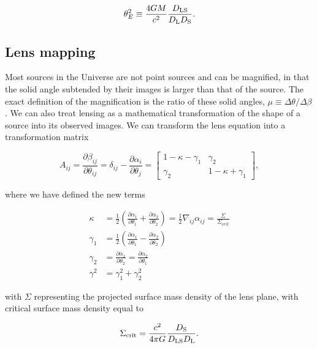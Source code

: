 \begin{equation}
\theta_E^2 \equiv \frac{4GM}{c^2} \frac{D_\mathrm{LS}}{D_\mathrm{L}D_\mathrm{S}}.
\label{intro:eqn:einstein_radius}
\end{equation}

\subsection{Lens mapping}

Most sources in the Universe are not point sources and can be magnified, in that the solid angle subtended by their images is larger than that of the source. The exact definition of the magnification is the ratio of these solid angles,
$\mu \equiv \Delta \theta/\Delta \beta$. We can also treat lensing as a mathematical transformation of the shape of a source into its observed images. We can transform the lens equation into a transformation matrix

\begin{equation}
A_{ij} = \frac{\partial \beta_{ij}}{\partial \theta_{ij}} = \delta_{ij} - \frac{\partial{\alpha_{i}}}{\partial{\theta_{j}}} = 
	\begin{bmatrix}
		1-\kappa-\gamma_1 & \gamma_2 \\
		\gamma_2 & 1-\kappa+\gamma_1
	\end{bmatrix},
\end{equation}

\noindent where we have defined the new terms

\begin{align}
\kappa &= \frac{1}{2} \left(\frac{\partial{\alpha_{1}}}{\partial{\theta_{1}}}+\frac{\partial{\alpha_{2}}}{\partial{\theta_{2}}}\right) = \frac{1}{2} \nabla_{ij} \alpha_{ij} = \frac{\Sigma}{\Sigma_{crit}} \label{intro:eqn:kappa} \\
\gamma_1 &= \frac{1}{2} \left(\frac{\partial{\alpha_{1}}}{\partial{\theta_{1}}}-\frac{\partial{\alpha_{2}}}{\partial{\theta_{2}}}\right) \\
\gamma_2 &= \frac{\partial{\alpha_{1}}}{\partial{\theta_{2}}} = \frac{\partial{\alpha_{2}}}{\partial{\theta_{1}}} \\
\gamma^2 &= \gamma_1^2 + \gamma_2^2
\end{align}

\noindent with $\Sigma$ representing the projected surface mass density of the lens plane, with critical surface mass density equal to

\begin{equation}
\Sigma_\mathrm{crit} = \frac{c^2}{4\pi G} \frac{D_\mathrm{S}}{D_\mathrm{LS}D_\mathrm{L}}.
\end{equation}

